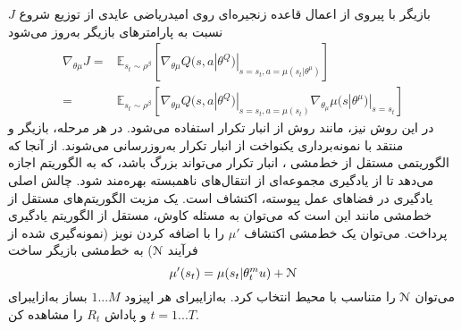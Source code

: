 بازیگر با پیروی از اعمال قاعده زنجیره‌ای روی امیدریاضی عایدی از توزیع شروع
$J$
نسبت به پارامترهای بازیگر به‌روز می‌شود
\begin{align}
	\nabla_{\theta \mu} J = & \mathbb{E}_{s_t \sim \rho ^{ \beta}} \left[ \nabla_{\theta \mu} Q(s,a|\theta^Q)|_{s=s_t,a=\mu (s_t|\theta^{\mu})}  \right] \\ \nonumber
	= & \mathbb{E}_{s_t \sim \rho ^{ \beta}} [ \nabla_{\theta \mu} Q(s,a|\theta^Q)|_{s=s_t, a=\mu (s_t)} \nabla_{\theta_{\mu}} \mu (s|\theta^{\mu})|_{s=s_t} ]
\end{align}
در این روش نیز، مانند روش 
از انبار تکرار استفاده می‌شود. 
در هر مرحله، بازیگر و منتقد با نمونه‌برداری یکنواخت از انبار تکرار به‌روزرسانی می‌شوند. از آنجا که 
الگوریتمی مستقل از خط‌مشی ، انبار تکرار می‌تواند بزرگ باشد، که به الگوریتم اجازه می‌دهد تا از یادگیری مجموعه‌ای از انتقال‌های ناهمبسته بهره‌مند شود.
چالش اصلی یادگیری در فضاهای عمل پیوسته، اکتشاف است. یک مزیت  الگوریتم‌های مستقل از خط‌مشی مانند 
این است که می‌توان به مسئله کاوش، مستقل از الگوریتم یادگیری پرداخت.
می‌توان یک خط‌مشی اکتشاف 
$\mu'$
را با اضافه کردن نویز (نمونه‌گیری شده از فرآیند $\EuScript{N}$) به خط‌مشی بازیگر ساخت
\begin{equation}
\mu'(s_t) = \mu(s_t|\theta_t^mu) + \EuScript{N}
\end{equation}
می‌توان $\EuScript{N}$ 
را متناسب با محیط انتخاب کرد.
\‌به‌ازای{برای هر اپیزود $1...M$}
 بساز
\‌به‌ازای{برای $t=1...T$}
 و پاداش $R_t$ را مشاهده کن.
